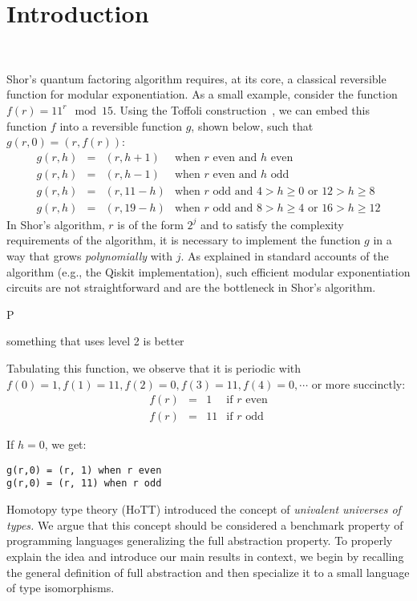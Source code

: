 \section{Introduction}~\label{sec:introduction}


Shor's quantum factoring algorithm requires, at its core, a classical reversible function for modular exponentiation. As
a small example, consider the function $f(r) = 11^{r} \mod 15$. Using the Toffoli construction~\cite{Toffoli:1980}, we
can embed this function $f$ into a reversible function $g$, shown below, such that $g(r,0) = (r,f(r))$:
\[\begin{array}{rcll}
g(r,h) &=& (r,h+1) & \mbox{when~$r$~even~and~$h$~even} \\
g(r,h) &=& (r,h-1) & \mbox{when~$r$~even~and~$h$~odd} \\
g(r,h) &=& (r,11-h) & \mbox{when~$r$~odd~and~$4 > h \geq 0$~or~$12 > h \geq 8$} \\
g(r,h) &=& (r,19-h) & \mbox{when~$r$~odd~and~$8 > h \geq 4$~or~$16 > h \geq 12$}
  \end{array}\]
In Shor's algorithm, $r$ is of the form $2^j$ and to satisfy the complexity requirements of the algorithm, it is
necessary to implement the function $g$ in a way that grows \emph{polynomially} with $j$. As explained in standard
accounts of the algorithm (e.g., the Qiskit implementation), such efficient modular exponentiation circuits are not
straightforward and are the bottleneck in Shor’s algorithm.

P~\cite{shorefficient}

something that uses level 2 is better



Tabulating this function, we observe that it is periodic with
$f(0) = 1, f(1) = 11, f(2) = 0, f(3) = 11, f(4) = 0, \cdots$ or more succinctly:
\[\begin{array}{rcll}
f(r) &=& 1 & \mbox{if~$r$~even} \\
f(r) &=& 11 & \mbox{if~$r$~odd}
\end{array}\]

If $h=0$, we get:

\begin{verbatim}
g(r,0) = (r, 1) when r even
g(r,0) = (r, 11) when r odd
\end{verbatim}

Homotopy type theory (HoTT) introduced the concept of \emph{univalent universes
  of types.} We argue that this concept should be considered a benchmark
property of programming languages generalizing the full abstraction property. To
properly explain the idea and introduce our main results in context, we begin by
recalling the general definition of full abstraction and then specialize it to a small
language of type isomorphisms.

